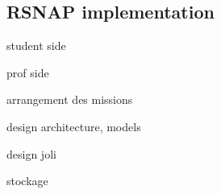 \subsection{RSNAP implementation}
student side

prof side

arrangement des missions

design architecture, models

design joli

stockage
